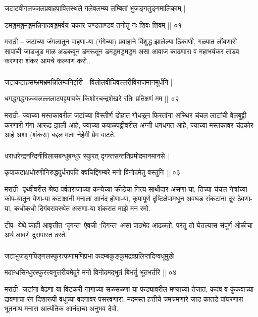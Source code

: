 
\begin{frame}[fragile]\frametitle{}

जटाटवीगलज्जलप्रवाहपावितस्थले गलेवलम्ब्य लम्बितां भुजङ्गतुङ्गमालिकाम् | 

डमड्डमड्डमड्डमन्निनादवड्डमर्वयं चकार चण्डताण्डवं तनोतु नः शिवः शिवम् || ०१


मराठी – जटांच्या जंगलातून वाहणा-या (गंगेच्या) प्रवाहाने विशुद्ध झालेल्या ठिकाणी, गळ्यात लोंबणारी सापांची जाडजूड माळ अडकवून डमरूतून डमड्डमड्डमड्डम असा आवाज काढणारा व महाभयंकर तांडव करणारा शंकर आमचे कल्याण करो.. 
\end{frame}

\begin{frame}[fragile]\frametitle{}
जटाकटाहसम्भ्रमभ्रमन्निलिम्पनिर्झरी- -विलोलवीचिवल्लरीविराजमानमूर्धनि | 

धगद्धगद्धगज्ज्वलल्ललाटपट्टपावके किशोरचन्द्रशेखरे रतिः प्रतिक्षणं मम || ०२ 


मराठी- ज्याच्या मस्तकावरील जटांच्या विस्तीर्ण डोहात गोंधळून फिरतांना अस्थिर चंचल लाटांची वेलबुट्टी करणारी गंगा आरूढ झाली आहे, ज्याच्या कपाळपट्टीवरील अग्नी धगधगत आहे, ज्याच्या मस्तकावर चंद्रकोर आहे अशा (शंकरा) बद्दल मला नेहेमी प्रेम वाटते. 
\end{frame}

\begin{frame}[fragile]\frametitle{}
धराधरेन्द्रनन्दिनीविलासबन्धुबन्धुर स्फुरत् दृगन्तसन्ततिप्रमोदमानमानसे | 

कृपाकटाक्षधोरणीनिरुद्धदुर्धरापदि क्वचिद्दिगम्बरे मनो विनोदमेतु वस्तुनि || ०३ 


मराठी- पृथ्वीवरील श्रेष्ठ पर्वतराजाच्या कन्येच्या क्रीडेचा नित्य साथीदार असणा-या, तिच्या चंचल नेत्रांच्या कोप-यातून येणा-या कटाक्षांनी मनाला आनंद होणा-या, कृपापूर्ण दृष्टिक्षेपांमधून अवघड संकटांना दूर ठेवणा-या, कधीकधी दिगंबरावस्थेत असणा-या शंकरात माझे मन रमो. 

टीप- येथे काही आवृत्तीत ‘दृगन्त’ ऐवजी ‘दिगन्त’ असा पाठभेद आढळतो. परंतु तो घेतल्यास संपूर्ण ओळीचा अर्थ लावणे दुरापास्त ठरते. 
\end{frame}

\begin{frame}[fragile]\frametitle{}
जटाभुजङ्गपिङ्गलस्फुरत्फणामणिप्रभा कदम्बकुङ्कुमद्रवप्रलिप्तदिग्वधूमुखे | 

मदान्धसिन्धुरस्फुरत्त्वगुत्तरीयमेदुरे मनो विनोदमद्भुतं बिभर्तु भूतभर्तरि || ०४ 


मराठी- जटांना वेढणा-या विटकरी नागाच्या सळसळणा-या फड्यावरील मण्याच्या तेजात, कदंब व कुंकवाच्या द्रावणाचा रंग दिशारूपी वधूच्या वदनावर पसरवणारा, मदमस्त हत्तीचे चमचमणारे जाड कातडे पांघरणारा भूतनाथ मनास आत्यंतिक आनंदाचा अनुभव देवो. 
\end{frame}


